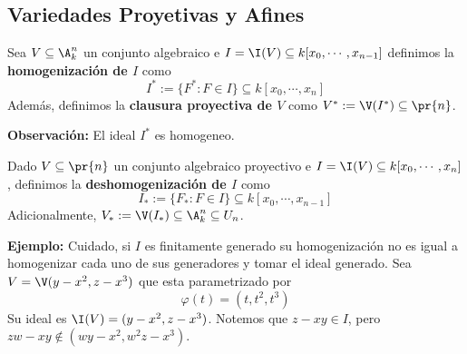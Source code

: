 \documentclass{article}
\begin{document}
\subsection{Variedades Proyetivas y Afines}
\begin{dfn}
    Sea $V\subseteq\A^{n}_{k}$ un conjunto algebraico e $I=\I(V)\subseteq k[x_{0},\cdots,x_{n-1}]$
    definimos la \textbf{homogenización de $I$} como
    \begin{equation*}
        I^{*}:=\{F^{*}:F\in I\}\subseteq k[x_{0},\cdots,x_{n}]
    \end{equation*}
    Además, definimos la \textbf{clausura proyectiva de $V$} como $V^{*}:=\V(I^{*})\subseteq
    \pr{n}$.
\end{dfn}
\noindent\textbf{Observación:} El ideal $I^{*}$ es homogeneo.

\begin{dfn}
    Dado $V\subseteq\pr{n}$ un conjunto algebraico proyectivo e $I=\I(V)\subseteq 
    k[x_{0},\cdots,x_{n}]$, definimos la \textbf{deshomogenización de $I$} como
    \begin{equation*}
        I_{*}:=\{F_{*}:F\in I\}\subseteq k[x_{0},\cdots,x_{n-1}]
    \end{equation*}
    Adicionalmente, $V_{*}:=\V(I_{*})\subseteq\A^{n}_{k}\subseteq U_{n}$.
\end{dfn}
\noindent\textbf{Ejemplo:} Cuidado, si $I$ es finitamente generado su homogenización no es igual a
homogenizar cada uno de sus generadores y tomar el ideal generado. Sea $V=\V(y-x^{2},z-x^{3})$ 
que esta parametrizado por
\begin{equation*}
    \varphi(t)=(t,t^{2},t^{3})
\end{equation*}
Su ideal es $\I(V)=(y-x^{2},z-x^{3})$. Notemos que $z-xy\in I$, pero $zw-xy\not\in
(wy-x^{2},w^{2}z-x^{3})$.
\end{document}

